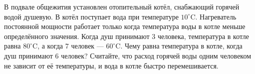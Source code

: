 В подвале общежития установлен отопительный котёл, снабжающий горячей водой душевую. В котёл поступает вода при температуре $10^\circ\mathrm{C}$. Нагреватель постоянной мощности работает только когда температура воды в котле меньше определённого значения. Когда душ принимают $3$ человека, температура в котле равна $80^\circ\mathrm{C}$, а когда $7$ человек --- $60^\circ\mathrm{C}$. Чему равна температура в котле, когда душ принимают $6$ человек? Считайте, что расход горячей воды одним человеком не зависит от её температуры, и вода в котле быстро перемешивается.
